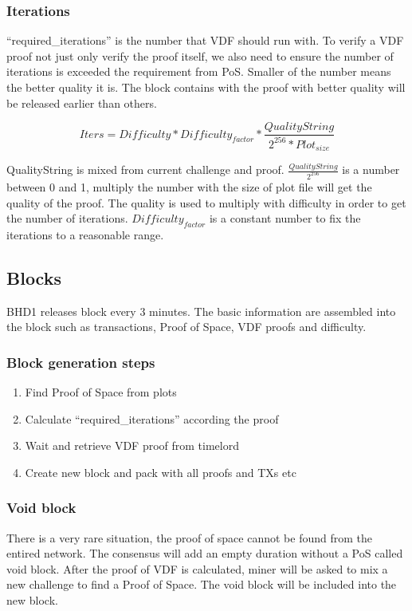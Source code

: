 \subsubsection{Iterations}
\begin{flushleft}
    ``required\_iterations'' is the number that VDF should run with. To verify a VDF proof not just only verify the proof itself, we also need to ensure the number of iterations is exceeded the requirement from PoS. Smaller of the number means the better quality it is. The block contains with the proof with better quality will be released earlier than others.
\end{flushleft}
\begin{equation}
    Iters = Difficulty * Difficulty_{factor} * \frac{QualityString}{2^{256} * Plot_{size}}
\end{equation}
\begin{flushleft}
    QualityString is mixed from current challenge and proof. $\frac{QualityString}{2^{256}}$ is a number between 0 and 1, multiply the number with the size of plot file will get the quality of the proof. The quality is used to multiply with difficulty in order to get the number of iterations. $Difficulty_{factor}$ is a constant number to fix the iterations to a reasonable range.
\end{flushleft}
\subsection{Blocks}
\begin{flushleft}
    BHD1 releases block every 3 minutes. The basic information are assembled into the block such as transactions, Proof of Space, VDF proofs and difficulty.
\end{flushleft}
\subsubsection{Block generation steps}
\begin{enumerate}
    \item Find Proof of Space from plots
    \item Calculate ``required\_iterations'' according the proof
    \item Wait and retrieve VDF proof from timelord
    \item Create new block and pack with all proofs and TXs etc
\end{enumerate}

\subsubsection{Void block}
\begin{flushleft}
    There is a very rare situation, the proof of space cannot be found from the entired network. The consensus will add an empty duration without a PoS called void block. After the proof of VDF is calculated, miner will be asked to mix a new challenge to find a Proof of Space. The void block will be included into the new block.
\end{flushleft}
